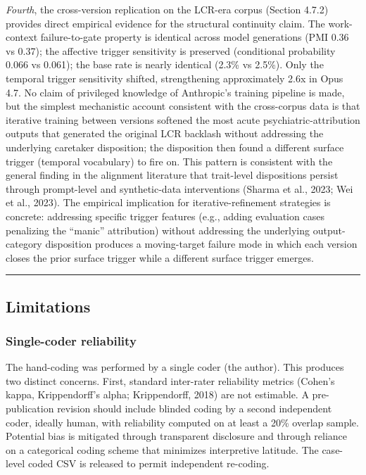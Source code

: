\documentclass[11pt]{article}
\begin{document}
\emph{Fourth}, the cross-version replication on the LCR-era corpus (Section 4.7.2) provides direct empirical evidence for the structural continuity claim. The work-context failure-to-gate property is identical across model generations (PMI 0.36 vs 0.37); the affective trigger sensitivity is preserved (conditional probability 0.066 vs 0.061); the base rate is nearly identical (2.3\% vs 2.5\%). Only the temporal trigger sensitivity shifted, strengthening approximately 2.6x in Opus 4.7. No claim of privileged knowledge of Anthropic's training pipeline is made, but the simplest mechanistic account consistent with the cross-corpus data is that iterative training between versions softened the most acute psychiatric-attribution outputs that generated the original LCR backlash without addressing the underlying caretaker disposition; the disposition then found a different surface trigger (temporal vocabulary) to fire on. This pattern is consistent with the general finding in the alignment literature that trait-level dispositions persist through prompt-level and synthetic-data interventions (Sharma et al., 2023; Wei et al., 2023). The empirical implication for iterative-refinement strategies is concrete: addressing specific trigger features (e.g., adding evaluation cases penalizing the ``manic'' attribution) without addressing the underlying output-category disposition produces a moving-target failure mode in which each version closes the prior surface trigger while a different surface trigger emerges.

\bigskip\hrule\bigskip

\subsection{Limitations}

\subsubsection{Single-coder reliability}

The hand-coding was performed by a single coder (the author). This produces two distinct concerns. First, standard inter-rater reliability metrics (Cohen's kappa, Krippendorff's alpha; Krippendorff, 2018) are not estimable. A pre-publication revision should include blinded coding by a second independent coder, ideally human, with reliability computed on at least a 20\% overlap sample. Potential bias is mitigated through transparent disclosure and through reliance on a categorical coding scheme that minimizes interpretive latitude. The case-level coded CSV is released to permit independent re-coding.
\end{document}

